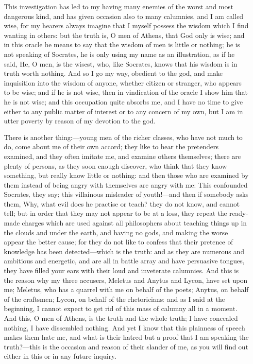 \documentclass[12pt]{article}
\begin{document}
This investigation has led to my having many enemies of the worst
and most dangerous kind, and has given occasion also to many calumnies,
and I am called wise, for my hearers always imagine that I myself
possess the wisdom which I find wanting in others: but the truth is,
O men of Athens, that God only is wise; and in this oracle he means
to say that the wisdom of men is little or nothing; he is not speaking
of Socrates, he is only using my name as an illustration, as if he
said, He, O men, is the wisest, who, like Socrates, knows that his
wisdom is in truth worth nothing. And so I go my way, obedient to
the god, and make inquisition into the wisdom of anyone, whether citizen
or stranger, who appears to be wise; and if he is not wise, then in
vindication of the oracle I show him that he is not wise; and this
occupation quite absorbs me, and I have no time to give either to
any public matter of interest or to any concern of my own, but I am
in utter poverty by reason of my devotion to the god.

There is another thing:---young men of the richer classes, who have
not much to do, come about me of their own accord; they like to hear
the pretenders examined, and they often imitate me, and examine others
themselves; there are plenty of persons, as they soon enough discover,
who think that they know something, but really know little or nothing:
and then those who are examined by them instead of being angry with
themselves are angry with me: This confounded Socrates, they say;
this villainous misleader of youth!---and then if somebody asks them,
Why, what evil does he practise or teach? they do not know, and cannot
tell; but in order that they may not appear to be at a loss, they
repeat the ready-made charges which are used against all philosophers
about teaching things up in the clouds and under the earth, and having
no gods, and making the worse appear the better cause; for they do
not like to confess that their pretence of knowledge has been detected---which
is the truth: and as they are numerous and ambitious and energetic, and are all
in battle array and have persuasive tongues, they have
filled your ears with their loud and inveterate calumnies. And this
is the reason why my three accusers, Meletus and Anytus and Lycon,
have set upon me; Meletus, who has a quarrel with me on behalf of
the poets; Anytus, on behalf of the craftsmen; Lycon, on behalf of
the rhetoricians: and as I said at the beginning, I cannot expect
to get rid of this mass of calumny all in a moment. And this, O men
of Athens, is the truth and the whole truth; I have concealed nothing,
I have dissembled nothing. And yet I know that this plainness of speech
makes them hate me, and what is their hatred but a proof that I am
speaking the truth?---this is the occasion and reason of their slander
of me, as you will find out either in this or in any future inquiry.
\end{document}
